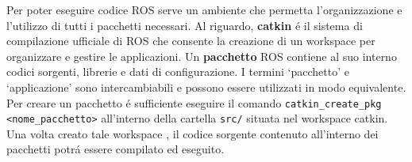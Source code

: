 Per poter eseguire codice ROS serve un ambiente che permetta l'organizzazione e l'utilizzo di tutti i pacchetti necessari. 
Al riguardo, \textbf{catkin} \'{e} il sistema di compilazione ufficiale di ROS che consente la creazione di un workspace per 
organizzare e gestire le applicazioni. 
Un \textbf{pacchetto} ROS contiene al suo interno codici sorgenti, librerie e dati di configurazione. 
I termini `pacchetto' e `applicazione' sono intercambiabili e possono essere utilizzati in modo equivalente.
Per creare un pacchetto \'{e} sufficiente eseguire il comando 
\verb|catkin_create_pkg <nome_pacchetto>| all'interno della cartella \verb|src/| situata nel workspace catkin.
Una volta creato tale workspace \cite{catkin_ws}, il codice sorgente contenuto all'interno dei pacchetti potr\'{a} essere 
compilato ed eseguito.
